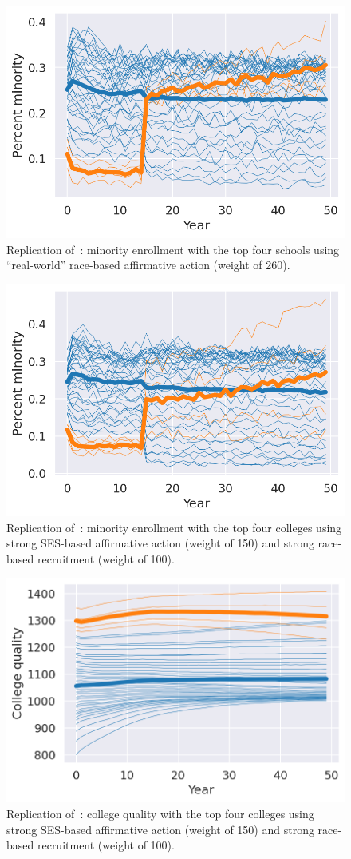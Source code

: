 \begin{figure}
  \centering
  \includegraphics[width=.75\linewidth]{figures/figC2.png}
  \caption{Replication of~\cite[Figure~C2, p.~42]{reardon2018levels}: minority enrollment with the top four schools using ``real-world'' race-based affirmative action (weight of 260).}
  \label{fig:c2}
\end{figure}

\begin{figure}
  \centering
  \includegraphics[width=.75\linewidth]{figures/figC4.png}
  \caption{Replication of~\cite[Figure~C4, p.~44]{reardon2018levels}: minority enrollment with the top four colleges using strong SES-based affirmative action (weight of 150) and strong race-based recruitment (weight of 100).}
  \label{fig:c4}
\end{figure}

\begin{figure}
  \centering
  \includegraphics[width=.75\linewidth]{figures/figC5.png}
  \hfill%
  \caption{Replication of~\cite[Figure~C5, p.~45]{reardon2018levels}: college quality with the top four colleges using strong SES-based affirmative action (weight of 150) and strong race-based recruitment (weight of 100).}
  \label{fig:c5}
\end{figure}


